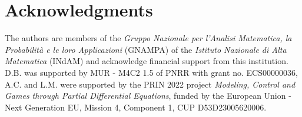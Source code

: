 \documentclass[11pt,a4paper]{article}
\begin{document}
\section*{Acknowledgments}
The authors are members of the {\em Gruppo Nazionale per l'Analisi Matematica, la Probabilit\`{a} e le loro Applicazioni} (GNAMPA) of the {\em Istituto Nazionale di Alta Matematica} (INdAM) and acknowledge financial support from this institution. D.B. was supported by MUR - M4C2 1.5 of PNRR with grant no. ECS00000036, A.C. and L.M. were supported by the PRIN 2022 project \emph{Modeling, Control and
Games through Partial Differential Equations}, funded by the European
Union - Next Generation EU, Mission 4, Component 1, CUP
D53D23005620006.

{\small


}
\end{document}
